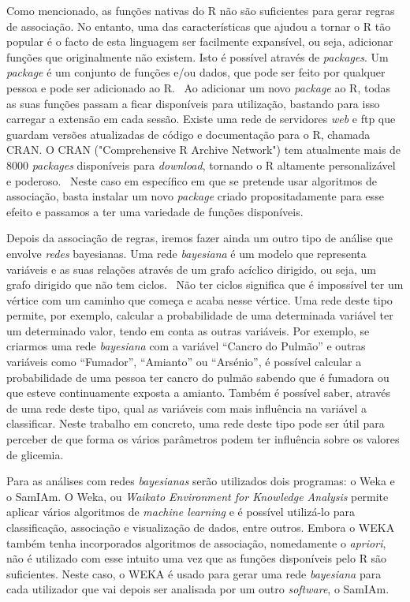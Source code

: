 Como mencionado, as funções nativas do R não são suficientes para gerar regras de associação. No entanto, uma das características que ajudou a tornar o R tão popular é o facto de esta linguagem ser facilmente expansível, ou seja, adicionar funções que originalmente não existem. Isto é possível através de \textit{packages}.
Um \textit{package} é um conjunto de funções e/ou dados, que pode ser feito por qualquer pessoa e pode ser adicionado ao R.~\cite{packages} Ao adicionar um novo \textit{package} ao R, todas as suas funções passam a ficar disponíveis para utilização, bastando para isso carregar a extensão em cada sessão. Existe uma rede de servidores \textit{web} e ftp que guardam versões atualizadas de código e documentação para o R, chamada CRAN. O CRAN ("Comprehensive R Archive Network") tem atualmente mais de 8000 \textit{packages} disponíveis para \textit{download}, tornando o R altamente personalizável e poderoso.~\cite{cran}
Neste caso em específico em que se pretende usar algoritmos de associação, basta instalar um novo \textit{package} criado propositadamente para esse efeito e passamos a ter uma variedade de funções disponíveis. 

Depois da associação de regras, iremos fazer ainda um outro tipo de análise que envolve \textit{redes} bayesianas. Uma rede \textit{bayesiana} é um modelo que representa variáveis e as suas relações através de um grafo acíclico dirigido, ou seja, um grafo dirigido que não tem ciclos.~\cite{bayes} Não ter ciclos significa que é impossível ter um vértice com um caminho que começa e acaba nesse vértice. Uma rede deste tipo permite, por exemplo, calcular a probabilidade de uma determinada variável ter um determinado valor, tendo em conta as outras variáveis. Por exemplo, se criarmos uma rede \textit{bayesiana} com a variável ``Cancro do Pulmão'' e outras variáveis como ``Fumador'', ``Amianto'' ou ``Arsénio'', é possível calcular a probabilidade de uma pessoa ter cancro do pulmão sabendo que é fumadora ou que esteve continuamente exposta a amianto. Também é possível saber, através de uma rede deste tipo, qual as variáveis com mais influência na variável a classificar. Neste trabalho em concreto, uma rede deste tipo pode ser útil para perceber de que forma os vários parâmetros podem ter influência sobre os valores de glicemia.

Para as análises com redes \textit{bayesianas} serão utilizados dois programas: o Weka e o SamIAm.
O Weka, ou \textit{Waikato Environment for Knowledge Analysis} permite aplicar vários algoritmos de \textit{machine learning} e é possível utilizá-lo para classificação, associação e visualização de dados, entre outros. Embora o WEKA também tenha incorporados algoritmos de associação, nomedamente o \textit{apriori}, não é utilizado com esse intuito uma vez que as funções disponíveis pelo R são suficientes. Neste caso, o WEKA é usado para gerar uma rede \textit{bayesiana} para cada utilizador que vai depois ser analisada por um outro \textit{software}, o SamIAm.

